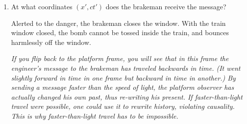 \begin{enumerate}[wide]
\item At what coordinates $(x', ct')$ does the brakeman receive the message?
\answerspace{0.7in}

Alerted to the danger, the brakeman closes the window. With the train window closed, the bomb cannot be tossed inside the train, and bounces harmlessly off the window. 
\bigskip

\textit{If you flip back to the platform frame, you will see that in this frame the engineer's message to the brakeman has traveled backwards in time.  (It went slightly forward in time in one frame but backward in time in another.)  By sending a message faster than the speed of light, the platform observer has actually changed his own past, thus re-writing his present.  If faster-than-light travel were possible, one could use it to rewrite history, violating causality.  This is why faster-than-light travel has to be impossible.}


\end{enumerate}
